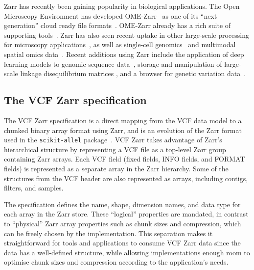 \documentclass[a4paper,num-refs]{oup-contemporary}
\begin{document}
Zarr has recently been gaining popularity in biological applications.
The Open Microscopy Environment has developed OME-Zarr~\cite{moore2023ome} as one
of its ``next generation'' cloud ready file formats~\citep{moore2021ome}.
OME-Zarr already has a rich suite of supporting
tools~\cite{moore2023ome,rzepka2023toward}.
Zarr has also seen recent uptake in other large-scale processing for
microscopy applications~\citep{ruan2024image}, as well as
single-cell genomics~\citep{dhapola2022scarf,virshup2023scverse}
and multimodal spatial omics
data~\citep{marconato2024spatialdata,baker2023emobject}.
Recent additions using Zarr include the application of deep learning
models to genomic sequence data~\citep{klie2023predictive}, storage and
manipulation of large-scale linkage disequilibrium matrices \cite{zabad2023fast},
and a browser for genetic variation data~\citep{konig2023divbrowse}.

\subsection{The VCF Zarr specification}
The VCF Zarr specification is a direct mapping from the VCF data model
to a chunked binary array format using Zarr,
and is an evolution of the Zarr format used in the \texttt{scikit-allel}
package~\citep{miles2023scikit}.
VCF Zarr takes advantage
of Zarr's hierarchical structure by representing a VCF file as a top-level
Zarr group containing Zarr arrays. Each VCF field (fixed fields, INFO fields,
and FORMAT fields) is represented as a separate array in the Zarr hierarchy.
Some of the structures from the VCF header are also represented as arrays,
including contigs, filters, and samples.

The specification defines the name, shape, dimension names, and data type
for each array in the Zarr store. These ``logical'' properties are mandated,
in contrast to ``physical'' Zarr array properties such as chunk sizes and
compression, which can be freely chosen by the implementation. This
separation makes it straightforward for tools and applications to consume
VCF Zarr data since the data has a well-defined structure, while allowing
implementations enough room to optimise chunk sizes and compression
according to the application's needs.
\end{document}
